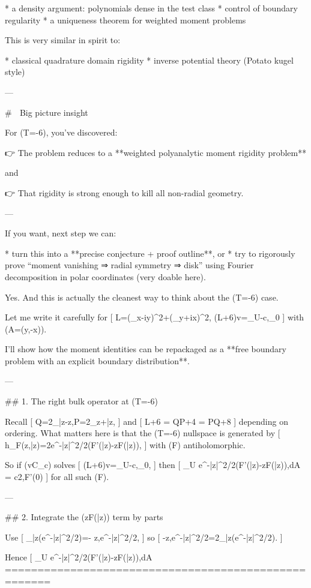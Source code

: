* a density argument: polynomials dense in the test class
* control of boundary regularity
* a uniqueness theorem for weighted moment problems

This is very similar in spirit to:

* classical quadrature domain rigidity
* inverse potential theory (Potato kugel style)

---

# 🚀 Big picture insight

For (T=-6), you’ve discovered:

👉 The problem reduces to a **weighted polyanalytic moment rigidity problem**

and

👉 That rigidity is strong enough to kill all non-radial geometry.

---

If you want, next step we can:

* turn this into a **precise conjecture + proof outline**, or
* try to rigorously prove “moment vanishing ⇒ radial symmetry ⇒ disk” using Fourier decomposition in polar coordinates (very doable here).

Yes. And this is actually the cleanest way to think about the (T=-6) case.

Let me write it carefully for
[
L=(\partial_x-iy)^2+(\partial_y+ix)^2,
\qquad (L+6)v=_U-c,\delta_0
]
with (A=(y,-x)).

I’ll show how the moment identities can be repackaged as a **free boundary problem with an explicit boundary distribution**.

---

## 1. The right bulk operator at (T=-6)

Recall
[
Q=2\partial_{\bar z}-z,\qquad P=2\partial_z+\bar z,
]
and
[
L+6 = QP+4 = PQ+8
]
depending on ordering. What matters here is that the (T=-6) nullspace is generated by
[
h_F(z,\bar z)=2e^{-|z|^2/2}\big(F'(\bar z)-zF(\bar z)\big),
]
with (F) antiholomorphic.

So if (v\in C_c) solves
[
(L+6)v=_U-c,\delta_0,
]
then
[
\int_U e^{-|z|^2/2}\big(F'(\bar z)-zF(\bar z)\big),dA
= \frac c2,F'(0)
]
for all such (F).

---

## 2. Integrate the (zF(\bar z)) term by parts

Use
[
\partial_{\bar z}\big(e^{-|z|^2/2}\big)=- z,e^{-|z|^2/2},
]
so
[
-z,e^{-|z|^2/2}=2\partial_{\bar z}\big(e^{-|z|^2/2}\big).
]

Hence
[
\int_U e^{-|z|^2/2}\big(F'(\bar z)-zF(\bar z)\big),dA
=====================================================


